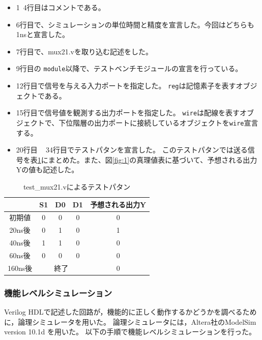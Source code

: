 \documentclass[uplatex]{jsarticle}
\begin{document}
\begin{itemize}
  \item 1~4行目はコメントである。
  \item 6行目で、シミュレーションの単位時間と精度を宣言した。今回はどちらも1nsと宣言した。
  \item 7行目で、mux21.vを取り込む記述をした。
  \item 9行目の {\tt module}以降で、テストベンチモジュールの宣言を行っている。
  \item 12行目で信号を与える入力ポートを指定した。
        {\tt reg}は記憶素子を表すオブジェクトである。
  \item 15行目で信号値を観測する出力ポートを指定した。
        {\tt wire}は配線を表すオブジェクトで、下位階層の出力ポートに接続しているオブジェクトを{\tt wire}宣言する。
  \item 20行目 ~ 34行目でテストパタンを宣言した。
        このテストパタンでは送る信号を表\ref{tab:1}にまとめた。また、図\ref{fig:1}の真理値表に基づいて、予想される出力Yの値も記述した。
\end{itemize}

\begin{table}[htb]
  \begin{center}
    \caption{test\_mux21.vによるテストパタン}
    \begin{tabular}{c|ccc|c} \hline
       　　　  & S1 & D0 & D1 & 予想される出力Y \\ \hline \hline
      初期値   & 0 & 0 & 0 & 0 \\
      20ns後  & 0 & 1 & 0 & 1 \\
      40ns後  & 1 & 1 & 0 & 0 \\
      60ns後  & 0 & 0 & 0 & 0 \\
      160ns後 & \multicolumn{3}{c|}{終了} & 0 \\ \hline
    \end{tabular}
    \label{tab:1}
  \end{center}
\end{table}

\subsubsection{機能レベルシミュレーション}

Verilog HDLで記述した回路が，機能的に正しく動作するかどうかを調べるために，論理シミュレータを用いた。
論理シミュレータには，Altera社のModelSim version 10.1d を用いた。
以下の手順で機能レベルシミュレーションを行った。
\end{document}
